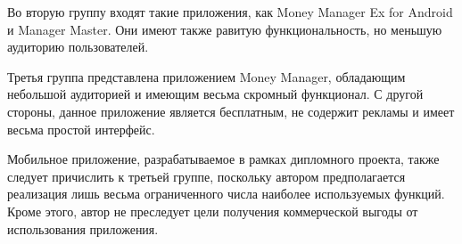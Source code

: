 Во вторую группу входят такие приложения, как
Money Manager Ex for Android и Manager Master.
Они имеют также равитую функциональность, но меньшую аудиторию пользователей.

Третья группа представлена приложением Money Manager,
обладающим небольшой аудиторией и имеющим весьма скромный функционал.
С другой стороны, данное приложение является бесплатным, не содержит рекламы
и имеет весьма простой интерфейс.

Мобильное приложение, разрабатываемое в рамках дипломного проекта,
также следует причислить к третьей группе,
поскольку автором предполагается реализация лишь весьма ограниченного числа
наиболее используемых функций.
Кроме этого, автор не преследует цели получения коммерческой выгоды
от использования приложения.

